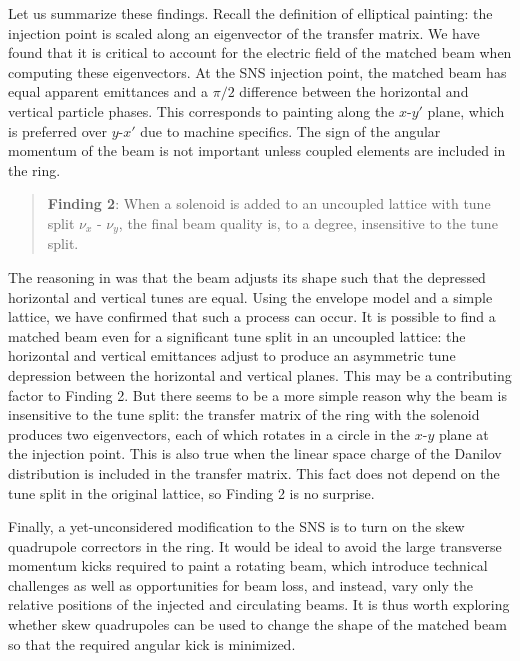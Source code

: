 Let us summarize these findings. Recall the definition of elliptical painting: the injection point is scaled along an eigenvector of the transfer matrix. We have found that it is critical to account for the electric field of the matched beam when computing these eigenvectors. At the SNS injection point, the matched beam has equal apparent emittances and a $\pi / 2$ difference between the horizontal and vertical particle phases. This corresponds to painting along the $x$-$y'$ plane, which is preferred over $y$-$x'$ due to machine specifics. The sign of the angular momentum of the beam is not important unless coupled elements are included in the ring. 


%
\begin{quote}
    \textbf{Finding 2}: When a solenoid is added to an uncoupled lattice with tune split $\nu_x$ - $\nu_y$, the final beam quality is, to a degree, insensitive to the tune split. 
\end{quote}
%
The reasoning in \cite{Holmes2018} was that the beam adjusts its shape such that the depressed horizontal and vertical tunes are equal. Using the envelope model and a simple lattice, we have confirmed that such a process can occur. It is possible to find a matched beam even for a significant tune split in an uncoupled lattice: the horizontal and vertical emittances adjust to produce an asymmetric tune depression between the horizontal and vertical planes. This may be a contributing factor to Finding 2. But there seems to be a more simple reason why the beam is insensitive to the tune split: the transfer matrix of the ring with the solenoid produces two eigenvectors, each of which rotates in a circle in the $x$-$y$ plane at the injection point. This is also true when the linear space charge of the Danilov distribution is included in the transfer matrix. This fact does not depend on the tune split in the original lattice, so Finding 2 is no surprise.

Finally, a yet-unconsidered modification to the SNS is to turn on the skew quadrupole correctors in the ring. It would be ideal to avoid the large transverse momentum kicks required to paint a rotating beam, which introduce technical challenges as well as opportunities for beam loss, and instead, vary only the relative positions of the injected and circulating beams. It is thus worth exploring whether skew quadrupoles can be used to change the shape of the matched beam so that the required angular kick is minimized.



